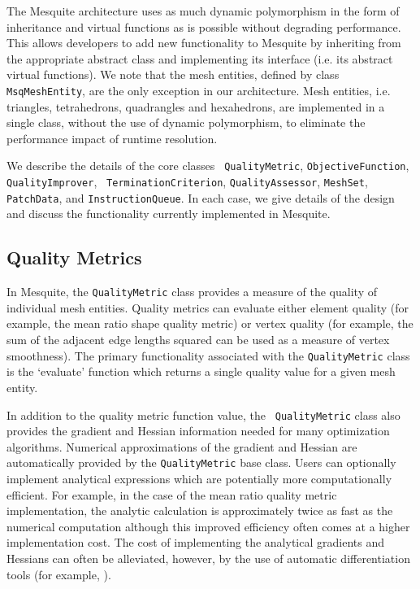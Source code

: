\documentclass[psfig]{article}
\begin{document}
The Mesquite architecture uses as much dynamic polymorphism in the
form of inheritance and virtual functions as is possible without
degrading performance.  This allows developers to add new
functionality to Mesquite by inheriting from the appropriate abstract
class and implementing its interface (i.e. its abstract virtual
functions).  We note that the mesh entities, defined by class {\tt
MsqMeshEntity}, are the only exception in our architecture.  Mesh
entities, i.e. triangles, tetrahedrons, quadrangles and hexahedrons,
are implemented in a single class, without the use of dynamic
polymorphism, to eliminate the performance impact of runtime
resolution.

We describe the details of the core classes {\tt
QualityMetric}, {\tt ObjectiveFunction}, {\tt QualityImprover}, {\tt
TerminationCriterion}, {\tt QualityAssessor}, {\tt MeshSet}, {\tt
PatchData}, and {\tt InstructionQueue}.
In each case, we give details
of the design and discuss the functionality currently implemented in
Mesquite.

\subsection{Quality Metrics} \label{sec:QM}

In Mesquite, the \texttt{QualityMetric} class provides a measure of
the quality of individual mesh entities.  Quality metrics can evaluate
either element quality (for example, the mean ratio shape quality
metric) or vertex quality (for example, the sum of the adjacent edge
lengths squared can be used as a measure of vertex smoothness).  
The primary functionality associated with the {\tt QualityMetric}
class is the `evaluate' function which returns a single quality value
for a given mesh entity.

In addition to the quality metric function value, the {\tt
QualityMetric} class also provides the gradient and Hessian
information needed for many optimization algorithms.  Numerical
approximations of the gradient and Hessian are automatically provided
by the \texttt{QualityMetric} base class.  Users can optionally
implement analytical expressions which are potentially more
computationally efficient.  For example, in the case of the mean ratio
quality metric implementation, the analytic calculation is
approximately twice as fast as the numerical computation although this
improved efficiency often comes at a higher implementation cost.  The
cost of implementing the analytical gradients and Hessians can often
be alleviated, however, by the use of automatic differentiation tools
(for example, \cite{bischofadic}).
\end{document}
